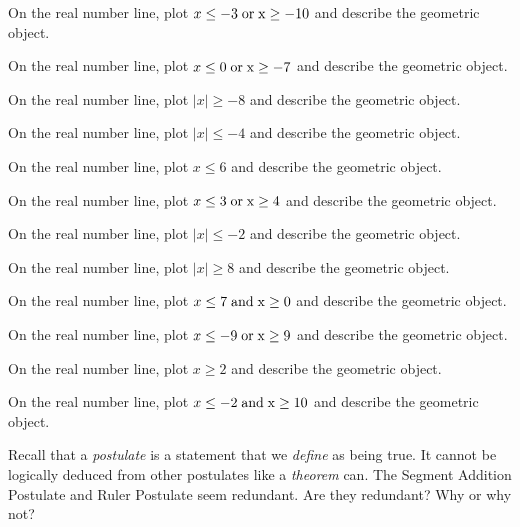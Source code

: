\documentclass[12pt]{article}
\newenvironment{problem}[2][Problem]{\begin{trivlist}
			\item[\hskip \labelsep {\bfseries #1}\hskip \labelsep {\bfseries #2.}]}{\end{trivlist}}
\begin{document}
			\begin{problem}{0} 
On the real number line, plot $ x \leq -3 \;\rm{ or }\; x \geq -10$ and describe the geometric object.
 \end{problem}\begin{problem}{1} 
On the real number line, plot $ x \leq 0 \;\rm{ or }\; x \geq -7$ and describe the geometric object.
 \end{problem}\begin{problem}{2} 
On the real number line, plot $\mid x\mid \geq -8$ and describe the geometric object.
 \end{problem}\begin{problem}{3} 
On the real number line, plot $\mid x\mid \leq -4$ and describe the geometric object.
 \end{problem}\begin{problem}{4} 
On the real number line, plot $x \leq 6$ and describe the geometric object.
 \end{problem}\begin{problem}{5} 
On the real number line, plot $ x \leq 3 \;\rm{ or }\; x \geq 4$ and describe the geometric object.
 \end{problem}\begin{problem}{6} 
On the real number line, plot $\mid x\mid \leq -2$ and describe the geometric object.
 \end{problem}\begin{problem}{7} 
On the real number line, plot $\mid x\mid \geq 8$ and describe the geometric object.
 \end{problem}\begin{problem}{8} 
On the real number line, plot $ x \leq 7 \;\rm{ and }\; x \geq 0$ and describe the geometric object.
 \end{problem}\begin{problem}{9} 
On the real number line, plot $ x \leq -9 \;\rm{ or }\; x \geq 9$ and describe the geometric object.
 \end{problem}\begin{problem}{10} 
On the real number line, plot $x \geq 2$ and describe the geometric object.
 \end{problem}\begin{problem}{11} 
On the real number line, plot $ x \leq -2 \;\rm{ and }\; x \geq 10$ and describe the geometric object.
 \end{problem}\begin{problem}{Challenge} 

	Recall that a \textit{postulate} is a statement that we \textit{define} as being true. It cannot
	be logically deduced from other postulates like a \textit{theorem} can.
	The Segment Addition Postulate and Ruler Postulate seem redundant. Are they redundant? Why or why not?
	
 \end{problem}
\end{document}
